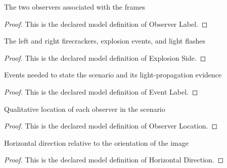 \begin{definition}
  \label{def:physics:phyx-mini-0633:phyxminiproblems-problemphyxmini0633-observerlabel}
  The two observers associated with the frames
\end{definition}
\begin{proof}
  This is the declared model definition of Observer Label.
\end{proof}
\begin{definition}
  \label{def:physics:phyx-mini-0633:phyxminiproblems-problemphyxmini0633-explosionside}
  The left and right firecrackers, explosion events, and light flashes
\end{definition}
\begin{proof}
  This is the declared model definition of Explosion Side.
\end{proof}
\begin{definition}
  \label{def:physics:phyx-mini-0633:phyxminiproblems-problemphyxmini0633-eventlabel}
  Events needed to state the scenario and its light-propagation evidence
\end{definition}
\begin{proof}
  This is the declared model definition of Event Label.
\end{proof}
\begin{definition}
  \label{def:physics:phyx-mini-0633:phyxminiproblems-problemphyxmini0633-observerlocation}
  Qualitative location of each observer in the scenario
\end{definition}
\begin{proof}
  This is the declared model definition of Observer Location.
\end{proof}
\begin{definition}
  \label{def:physics:phyx-mini-0633:phyxminiproblems-problemphyxmini0633-horizontaldirection}
  Horizontal direction relative to the orientation of the image
\end{definition}
\begin{proof}
  This is the declared model definition of Horizontal Direction.
\end{proof}
